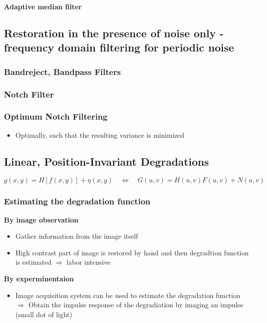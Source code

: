 \textbf{Adaptive median filter }\\



\subsection{Restoration in the presence of noise only - frequency domain filtering for periodic noise }
\subsubsection{Bandreject, Bandpass Filters }
\subsubsection{Notch Filter }
\subsubsection{Optimum Notch Filtering }
	\begin{itemize}
		\item Optimally, such that the resulting variance is minimized
	\end{itemize}
	
\subsection{Linear, Position-Invariant Degradations}
	\[
		g(x,y) = H[f(x,y)] + \eta(x,y) \quad
		\Leftrightarrow \quad
		G(u,v) = H(u,v)F(u,v) + N(u,v)
	\]
	
\subsubsection{Estimating the degradation function }
\textbf{By image observation}
	\begin{itemize}
		\item Gather information from the image itself
		\item High contrast part of image is restored by hand and then degradtion function is estimated $\Rightarrow$ labor intensive
	\end{itemize}
\textbf{By experminentaion}
	\begin{itemize}
		\item Image acquisition system can be used to estimate the degradation function\\
		$\Rightarrow$ Obtain the impulse response of the degradiation by imaging an impulse (small dot of light)
	\end{itemize}

